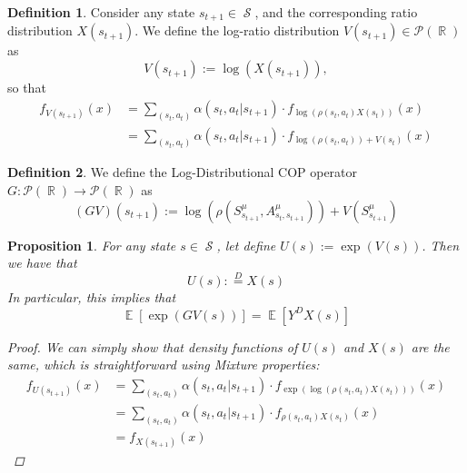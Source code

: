 \documentclass[12pt,a4paper,openright,twoside]{article}
\DeclareMathOperator*{\E}{\mathbb{E}}
\DeclareMathOperator*{\R}{\mathbb{R}}
\DeclareMathOperator*{\Sspace}{\mathcal{S}}
\numberwithin{equation}{section}
\newtheorem{prop}[theorem]{Proposition}
\theoremstyle{definition}
\newtheorem{definition}{Definition}
\theoremstyle{remark}
\theoremstyle{plain}
\begin{document}
\begin{definition}
	Consider any state $s_{t+1}\in \Sspace$, and the corresponding ratio distribution $X(s_{t+1})$. We define the log-ratio distribution $V(s_{t+1})\in \mathscr{P}(\R)$ as
\begin{equation*}
	V(s_{t+1}) := \log \left( X(s_{t+1}) \right), %
\end{equation*}
so that
\begin{equation*}
\begin{split}
	f_{V(s_{t+1})} (x) &= \sum_{(s_{t},a_{t})} \alpha(s_{t},a_{t}|s_{t+1}) \cdot f_{\log\left( \rho(s_{t},a_{t}) X(s_{t}) \right)}(x) \\
	&= \sum_{(s_{t},a_{t})} \alpha(s_{t},a_{t}|s_{t+1}) \cdot f_{\log\left( \rho(s_{t},a_{t})\right) + V(s_t)}(x)
\end{split}
\end{equation*}
\end{definition}

\begin{definition}
	We define the Log-Distributional COP operator $G: \mathscr{P}(\R) \rightarrow \mathscr{P}(\R)$ as
	\begin{equation}
		(G V) (s_{t+1}) := \log \left( \rho(S^{\mu}_{s_{t+1}},A^{\mu}_{s_{t},s_{t+1}}) \right) + V(S^{\mu}_{s_{t+1}})
	\end{equation}
	
\end{definition}

\begin{prop}
	For any state $s \in \Sspace$, let define $U(s):= \exp (V(s))$. Then we have that
	\begin{equation*}
		 U(s) :\stackrel{D}{=} X(s)
	\end{equation*}
	In particular, this implies that
	\begin{equation*}
		\E [\exp (GV(s))] = \E [Y^D X(s)]
	\end{equation*}
	\begin{proof}
	We can simply show that density functions of $U(s)$ and $X(s)$ are the same, which is straightforward using Mixture properties:
		\begin{equation}
		\begin{split}
			f_{U(s_{t+1})} (x) &= \sum_{(s_{t},a_{t})} \alpha(s_{t},a_{t}|s_{t+1}) \cdot f_{\exp \left( \log\left( \rho(s_{t},a_{t}) X(s_{t}) \right)\right)}(x) \\
			&= \sum_{(s_{t},a_{t})} \alpha(s_{t},a_{t}|s_{t+1}) \cdot f_{\rho(s_{t},a_{t}) X(s_{t})}(x) \\
			&= f_{X(s_{t+1})} (x)
		\end{split}
		\end{equation}
	\end{proof}
\end{prop}
\end{document}
